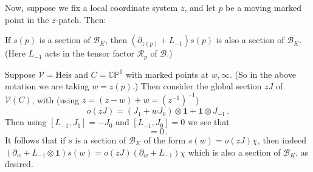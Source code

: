 \documentclass[12pt,letterpaper,reqno]{amsart}
\numberwithin{equation}{section}
\newcommand{\cB}{\ensuremath{\mathcal B}}
\newcommand{\Heis}{{\mathrm{Heis}}}
\newcommand{\bbC}{\ensuremath{\mathbb C}}
\newcommand{\bbP}{\ensuremath{\mathbb P}}
\newcommand\bid{{\mathbf 1}}
\newcommand{\vertex}{\mathcal{V}}
\newcommand{\vrep}{\mathcal{R}}
\begin{document}
Now, suppose we fix a local coordinate system 
$z$, and let $p$ be a moving marked point in the $z$-patch.
Then:
\begin{prop} \label{prop:translation-preserves-coinvariants}
If $s(p)$ is a section of $\cB_K$, then $(\partial_{z(p)} + L_{-1}) s(p)$ is also a section of $\cB_K$.
(Here $L_{-1}$ acts in the tensor factor $\vrep_p$ of $\cB$.)
\end{prop}

\begin{example}
Suppose $\vertex = \Heis$ and
$C = \bbC \bbP^1$ with marked points at $w,\infty$.
(So in the above notation we are taking $w = z(p)$.)
Then consider the global section $z J$ of $\vertex(C)$, with
(using $z = (z-w) + w = (z^{-1})^{-1}$)
\begin{equation}
 o(z J) = (J_1 + w J_0) \otimes \bid + \bid \otimes J_{-1} \, .
\end{equation}
Then using $[L_{-1}, J_1] = -J_0$ and $[L_{-1}, J_0] = 0$ we see that
\begin{equation}
  [\partial_w + L_{-1} \otimes \bid, o(z J)] = 0 \, .
\end{equation}
It follows that if $s$ is a section of $\cB_K$
of the form $s(w) = o(zJ) \chi$,
then indeed 
 $(\partial_w + L_{-1} \otimes \bid) s(w) = o(z J) (\partial_w + L_{-1}) \chi$
 which is also a section of $\cB_K$, as desired.
\end{example}
\end{document}
